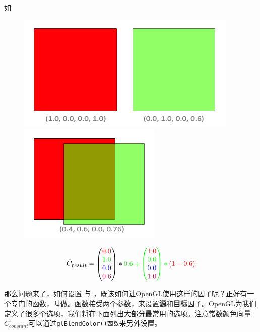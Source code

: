 \documentclass[UTF8,a4paper,12pt]{ctexbook}
\begin{document}
			如
			\begin{figure}[H]
				\centering
				\includegraphics[width=.9\linewidth]{blending_equation.png}
				\includegraphics[width=.59\linewidth]{blending_equation_mixed.png}				
			\end{figure}
			
			\begin{equation}
				\bar{C}_{result} = \begin{pmatrix} \color{red}{0.0} \\ \color{green}{1.0} \\ \color{blue}{0.0} \\ \color{purple}{0.6} \end{pmatrix} * \color{green}{0.6} + \begin{pmatrix} \color{red}{1.0} \\ \color{green}{0.0} \\ \color{blue}{0.0} \\ \color{purple}{1.0} \end{pmatrix} * \color{red}{(1 - 0.6)} 
			\end{equation}
			
			那么问题来了，如何设置 与 ，既该如何让OpenGL使用这样的因子呢？正好有一个专门的函数，叫做。函数接受两个参数，来\underline{设置}\textbf{源}和\textbf{目标}\underline{因子}。OpenGL为我们定义了很多个选项，我们将在下面列出大部分最常用的选项。注意常数颜色向量$C_{constant}$可以通过\verb|glBlendColor()函数|来另外设置。
			
\end{document}
